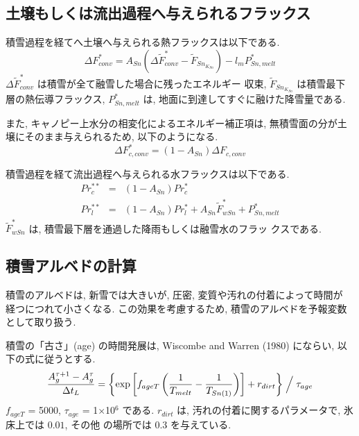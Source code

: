 \subsection{土壌もしくは流出過程へ与えられるフラックス}

積雪過程を経てへ土壌へ与えられる熱フラックスは以下である. 
\begin{equation}
\Delta F_{conv}^* = A_{Sn} ( \Delta \widetilde{F}_{conv}^* - \widetilde{F}_{Sn_{K_{Sn}}} ) - l_m P_{Sn,melt}^* 
\end{equation}
$\Delta \widetilde{F}_{conv}^*$ は積雪が全て融雪した場合に残ったエネルギー
収束, $\widetilde{F}_{Sn_{K_{Sn}}}$ は積雪最下層の熱伝導フラックス, 
$P_{Sn,melt}^*$ は, 地面に到達してすぐに融けた降雪量である. 

また, キャノピー上水分の相変化によるエネルギー補正項は, 無積雪面の分が土
壌にそのまま与えられるため, 以下のようになる. 
\begin{equation}
 \Delta F_{c,conv}^* = ( 1 - A_{Sn}) \Delta F_{c,conv} 
\end{equation}

積雪過程を経て流出過程へ与えられる水フラックスは以下である. 
\begin{eqnarray}
 Pr_c^{**} &=& ( 1 - A_{Sn} ) Pr_c^{*} \\
 Pr_l^{**} &=& ( 1 - A_{Sn} ) Pr_l^{*} + A_{Sn} \widetilde{F}_{wSn}^*
 + P_{Sn,melt}^* 
\end{eqnarray}
$\widetilde{F}_{wSn}^*$ は, 積雪最下層を通過した降雨もしくは融雪水のフラッ
クスである. 

\subsection{積雪アルベドの計算}

積雪のアルベドは, 新雪では大きいが, 圧密, 変質や汚れの付着によって時間が
経つにつれて小さくなる. この効果を考慮するため, 積雪のアルベドを予報変数
として取り扱う. 

積雪の「古さ」(age) の時間発展は, Wiscombe and Warren (1980) にならい,
以下の式に従うとする. 
\begin{equation}
 \frac {A_{g}^{\tau +1} - A_{g}^{\tau}}{\Delta t_L} 
 = \left\{
\exp \left[ f_{ageT} \left( \frac{1}{T_{melt}}-\frac{1}{T_{Sn(1)}}\right) \right] 
  + r_{dirt} \right\} \Bigm/ {\tau_{age}}
\end{equation}
$f_{ageT}$ = 5000, $\tau_{age}$ = 1$\times$10$^6$ である. 
$r_{dirt}$ は, 汚れの付着に関するパラメータで, 氷床上では $0.01$, その他
の場所では $0.3$ を与えている. 

